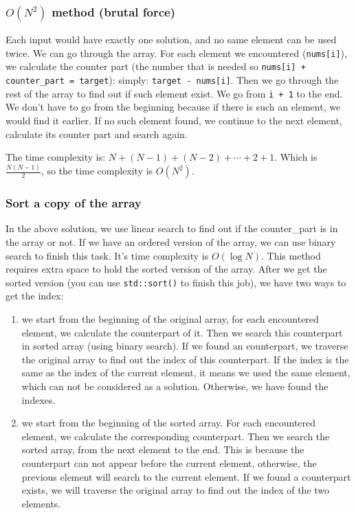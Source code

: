 \documentclass[11pt]{article}
\begin{document}
\subsubsection{\(O(N^2)\) method (brutal force)}
\label{sec:org0d769b5}
Each input would have exactly one solution, and no same element can be used twice. We can go through the array. For each element we encountered (\texttt{nums[i]}), we calculate the counter part (the number that is needed so \texttt{nums[i] + counter\_part = target}): simply: \texttt{target - nums[i]}. Then we go through the rest of the array to find out if such element exist. We go from \texttt{i + 1} to the end. We don't have to go from the beginning because if there is such an element, we would find it earlier. If no such element found, we continue to the next element, calculate its counter part and search again.

The time complexity is: \(N + (N - 1) + (N - 2) + \cdots + 2 + 1\). Which is \(\frac{N(N - 1)}{2}\), so the time complexity is \(O(N^2)\).
\subsubsection{Sort a copy of the array}
\label{sec:org4653d24}
In the above solution, we use linear search to find out if the counter\_part is in the array or not. If we have an ordered version of the array, we can use binary search to finish this task. It's time complexity is \(O(\log{N})\). This method requires extra space to hold the sorted version of the array. After we get the sorted version (you can use \texttt{std::sort()} to finish this job), we have two ways to get the index:
\begin{enumerate}
\item we start from the beginning of the original array, for each encountered element, we calculate the counterpart of it. Then we search this counterpart in sorted array (using binary search). If we found an counterpart, we traverse the original array to find out the index of this counterpart. If the index is the same as the index of the current element, it means we used the same element, which can not be considered as a solution. Otherwise, we have found the indexes.
\item we start from the beginning of the sorted array. For each encountered element, we calculate the corresponding counterpart. Then we search the sorted array, from the next element to the end. This is because the counterpart can not appear before the current element, otherwise, the previous element will search to the current element. If we found a counterpart exists, we will traverse the original array to find out the index of the two elements.
\end{enumerate}
\end{document}
